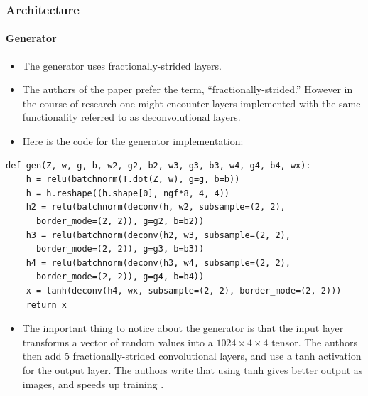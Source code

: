 \documentclass{beamer}
\begin{document}
\begin{frame}
\frametitle{Architecture}
\framesubtitle{Generator}
\begin{itemize}
 \item The generator uses fractionally-strided layers.
 \item The authors of the paper prefer the term, ``fractionally-strided.'' However
  in the course of research one might encounter layers implemented with the same
  functionality referred to as deconvolutional layers.
\item Here is the code for the generator implementation:
\end{itemize}
\begin{tiny} 
\begin{lstlisting}
def gen(Z, w, g, b, w2, g2, b2, w3, g3, b3, w4, g4, b4, wx):
    h = relu(batchnorm(T.dot(Z, w), g=g, b=b))
    h = h.reshape((h.shape[0], ngf*8, 4, 4))
    h2 = relu(batchnorm(deconv(h, w2, subsample=(2, 2), 
      border_mode=(2, 2)), g=g2, b=b2))
    h3 = relu(batchnorm(deconv(h2, w3, subsample=(2, 2), 
      border_mode=(2, 2)), g=g3, b=b3))
    h4 = relu(batchnorm(deconv(h3, w4, subsample=(2, 2), 
      border_mode=(2, 2)), g=g4, b=b4))
    x = tanh(deconv(h4, wx, subsample=(2, 2), border_mode=(2, 2)))
    return x
\end{lstlisting}
\end{tiny}
\begin{footnotesize}
\begin{itemize}
\item The important thing to notice about the generator is that the input
  layer transforms a vector of random values into a $1024  \times 4 \times 4$
  tensor.  The authors then add 5 fractionally-strided convolutional layers, and
  use a tanh activation for the output layer. The authors write that using tanh
  gives better output as images, and speeds up training \cite{repLearnDcgan}. 
\end{itemize}
\end{footnotesize}
\end{frame}

\end{document}

